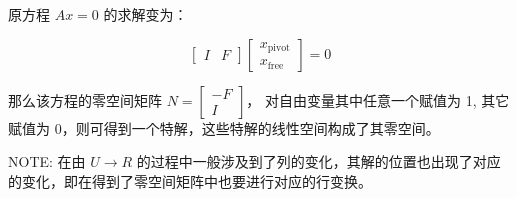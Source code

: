 \documentclass[
  letterpaper,
  DIV=11,
  numbers=noendperiod]{scrartcl}
\begin{document}
原方程 \(Ax = 0\) 的求解变为：

\[
\begin{bmatrix} I & F \end{bmatrix} \begin{bmatrix} x_{\text{pivot}} \\ x_{\text{free}}  \end{bmatrix} = 0
\]

那么该方程的零空间矩阵 \(N = \begin{bmatrix} -F \\ I \end{bmatrix}\)，
对自由变量其中任意一个赋值为 1, 其它赋值为
0，则可得到一个特解，这些特解的线性空间构成了其零空间。

NOTE: 在由 \(U \rightarrow R\)
的过程中一般涉及到了列的变化，其解的位置也出现了对应的变化，即在得到了零空间矩阵中也要进行对应的行变换。
\end{document}
